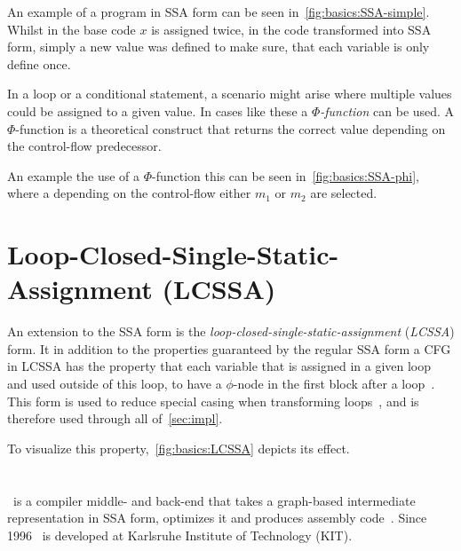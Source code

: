 An example of a program in SSA form can be seen in~\cref{fig:basics:SSA-simple}.
Whilst in the base code $x$ is assigned twice, in the code transformed into SSA form, simply a new value was defined to make sure, that each variable is only define once.



In a loop or a conditional statement, a scenario might arise where multiple values could be assigned to a given value.
In cases like these a \textit{$\Phi$-function} can be used.
A $\Phi$-function is a theoretical construct that returns the correct value depending on the control-flow predecessor.

An example the use of a $\Phi$-function this can be seen in~\cref{fig:basics:SSA-phi}, where a depending on the control-flow either $m_1$ or $m_2$ are selected.




\section{Loop-Closed-Single-Static-Assignment (LCSSA)}\label{sec:basics:LCSSA}

An extension to the SSA form is the \textit{loop-closed-single-static-assignment} (\textit{LCSSA}) form.
It in addition to the properties guaranteed by the regular SSA form a CFG in LCSSA has the property that each variable that is assigned in a given loop and used outside of this loop, to have a $\phi$-node in the first block after a loop~\cite{LLVM_LCSSA}\cite{gcc_lcssa}.
This form is used to reduce special casing when transforming loops~\cite{aebi18bachelorarbeit}, and is therefore used through all of~\cref{sec:impl}.

To visualize this property,~\cref{fig:basics:LCSSA} depicts its effect.



\section{\libFIRM}\label{sec:basics:firm}

\libFIRM~is a compiler middle- and back-end that takes a graph-based intermediate representation in SSA form, optimizes it and produces assembly code~\cite{libfirm}.
Since 1996 \libFIRM~is developed at Karlsruhe Institute of Technology (KIT).

